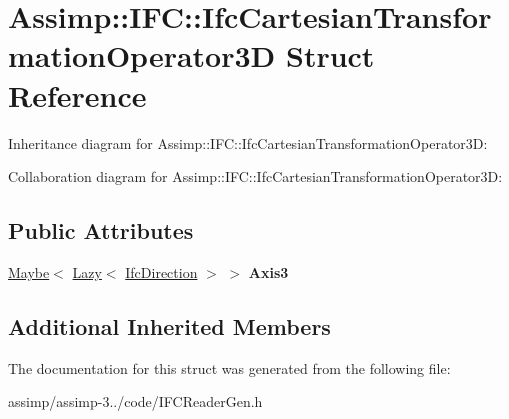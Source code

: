 \hypertarget{struct_assimp_1_1_i_f_c_1_1_ifc_cartesian_transformation_operator3_d}{\section{Assimp\+:\+:I\+F\+C\+:\+:Ifc\+Cartesian\+Transformation\+Operator3\+D Struct Reference}
\label{struct_assimp_1_1_i_f_c_1_1_ifc_cartesian_transformation_operator3_d}
}


Inheritance diagram for Assimp\+:\+:I\+F\+C\+:\+:Ifc\+Cartesian\+Transformation\+Operator3\+D\+:


Collaboration diagram for Assimp\+:\+:I\+F\+C\+:\+:Ifc\+Cartesian\+Transformation\+Operator3\+D\+:
\subsection*{Public Attributes}
\begin{DoxyCompactItemize}
\item 
\hypertarget{struct_assimp_1_1_i_f_c_1_1_ifc_cartesian_transformation_operator3_d_a237b685da4daf59b5ebfd52170aef668}{\hyperlink{struct_assimp_1_1_s_t_e_p_1_1_maybe}{Maybe}$<$ \hyperlink{struct_assimp_1_1_s_t_e_p_1_1_lazy}{Lazy}$<$ \hyperlink{struct_assimp_1_1_i_f_c_1_1_ifc_direction}{Ifc\+Direction} $>$ $>$ {\bfseries Axis3}}\label{struct_assimp_1_1_i_f_c_1_1_ifc_cartesian_transformation_operator3_d_a237b685da4daf59b5ebfd52170aef668}

\end{DoxyCompactItemize}
\subsection*{Additional Inherited Members}


The documentation for this struct was generated from the following file\+:\begin{DoxyCompactItemize}
\item 
assimp/assimp-\/3../code/I\+F\+C\+Reader\+Gen.\+h\end{DoxyCompactItemize}
